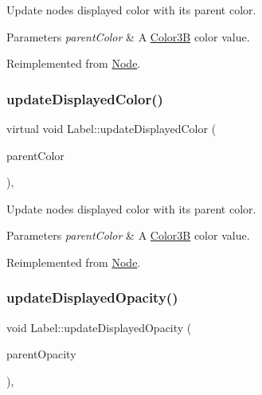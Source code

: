 Update node\textquotesingle{}s displayed color with its parent color. 
\begin{DoxyParams}{Parameters}
{\em parent\+Color} & A \hyperlink{structColor3B}{Color3B} color value. \\
\hline
\end{DoxyParams}


Reimplemented from \hyperlink{classNode_ac733bae7b9590f8da746cbc3d1337a2f}{Node}.

\mbox{\label{classLabel_a5810437c76649477d86f278a15e5f260}} 
\subsubsection{\texorpdfstring{update\+Displayed\+Color()}{updateDisplayedColor()}\hspace{0.1cm}{\footnotesize\ttfamily [2/2]}}
{\footnotesize\ttfamily virtual void Label\+::update\+Displayed\+Color (\begin{DoxyParamCaption}\item[{const \hyperlink{structColor3B}{Color3B} \&}]{parent\+Color }\end{DoxyParamCaption})\hspace{0.3cm}{\ttfamily [override]}, {\ttfamily [virtual]}}

Update node\textquotesingle{}s displayed color with its parent color. 
\begin{DoxyParams}{Parameters}
{\em parent\+Color} & A \hyperlink{structColor3B}{Color3B} color value. \\
\hline
\end{DoxyParams}


Reimplemented from \hyperlink{classNode_ac733bae7b9590f8da746cbc3d1337a2f}{Node}.

\mbox{\label{classLabel_a20eff3ff123e54a021c4149a7fcf0494}} 
\subsubsection{\texorpdfstring{update\+Displayed\+Opacity()}{updateDisplayedOpacity()}\hspace{0.1cm}{\footnotesize\ttfamily [1/2]}}
{\footnotesize\ttfamily void Label\+::update\+Displayed\+Opacity (\begin{DoxyParamCaption}\item[{G\+Lubyte}]{parent\+Opacity }\end{DoxyParamCaption})\hspace{0.3cm}{\ttfamily [override]}, {\ttfamily [virtual]}}

